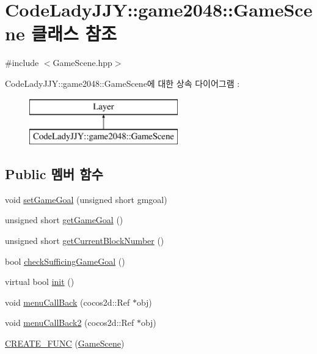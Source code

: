 \hypertarget{class_code_lady_j_j_y_1_1game2048_1_1_game_scene}{}\section{Code\+Lady\+J\+JY\+:\+:game2048\+:\+:Game\+Scene 클래스 참조}
\label{class_code_lady_j_j_y_1_1game2048_1_1_game_scene}


{\ttfamily \#include $<$Game\+Scene.\+hpp$>$}

Code\+Lady\+J\+JY\+:\+:game2048\+:\+:Game\+Scene에 대한 상속 다이어그램 \+: \begin{figure}[H]
\begin{center}
\leavevmode
\includegraphics[height=2.000000cm]{class_code_lady_j_j_y_1_1game2048_1_1_game_scene}
\end{center}
\end{figure}
\subsection*{Public 멤버 함수}
\begin{DoxyCompactItemize}
\item 
void \hyperlink{class_code_lady_j_j_y_1_1game2048_1_1_game_scene_ae674d90ff1c81818e308c99da876fbe8}{set\+Game\+Goal} (unsigned short gmgoal)
\item 
unsigned short \hyperlink{class_code_lady_j_j_y_1_1game2048_1_1_game_scene_a91a4b92af4105f3a0e60b58b96ec0cb5}{get\+Game\+Goal} ()
\item 
unsigned short \hyperlink{class_code_lady_j_j_y_1_1game2048_1_1_game_scene_a102fddfdf3e911218583dbc375786402}{get\+Current\+Block\+Number} ()
\item 
bool \hyperlink{class_code_lady_j_j_y_1_1game2048_1_1_game_scene_a9e9ea53a4ff493d0aafc2197c3bae12c}{check\+Sufficing\+Game\+Goal} ()
\item 
virtual bool \hyperlink{class_code_lady_j_j_y_1_1game2048_1_1_game_scene_ab0ccbc102ba9ceca94daddc2e8f253ba}{init} ()
\item 
void \hyperlink{class_code_lady_j_j_y_1_1game2048_1_1_game_scene_ac748b7487b72bc4722b7bbdb181e7267}{menu\+Call\+Back} (cocos2d\+::\+Ref $\ast$obj)
\item 
void \hyperlink{class_code_lady_j_j_y_1_1game2048_1_1_game_scene_a5fb8ef01d49e87cd898f4d9646dd3034}{menu\+Call\+Back2} (cocos2d\+::\+Ref $\ast$obj)
\item 
\hyperlink{class_code_lady_j_j_y_1_1game2048_1_1_game_scene_ae4a2a6b84c48c11a1be2339b59720b5e}{C\+R\+E\+A\+T\+E\+\_\+\+F\+U\+NC} (\hyperlink{class_code_lady_j_j_y_1_1game2048_1_1_game_scene}{Game\+Scene})
\end{DoxyCompactItemize}
